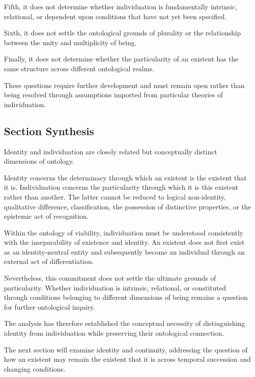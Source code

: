 Fifth, it does not determine whether individuation is fundamentally intrinsic, relational, or dependent upon conditions that have not yet been specified.

Sixth, it does not settle the ontological grounds of plurality or the relationship between the unity and multiplicity of being.

Finally, it does not determine whether the particularity of an existent has the same structure across different ontological realms.

These questions require further development and must remain open rather than being resolved through assumptions imported from particular theories of individuation.

\subsection{Section Synthesis}

Identity and individuation are closely related but conceptually distinct dimensions of ontology.

Identity concerns the determinacy through which an existent is the existent that it is. Individuation concerns the particularity through which it is this existent rather than another. The latter cannot be reduced to logical non-identity, qualitative difference, classification, the possession of distinctive properties, or the epistemic act of recognition.

Within the ontology of viability, individuation must be understood consistently with the inseparability of existence and identity. An existent does not first exist as an identity-neutral entity and subsequently become an individual through an external act of differentiation.

Nevertheless, this commitment does not settle the ultimate grounds of particularity. Whether individuation is intrinsic, relational, or constituted through conditions belonging to different dimensions of being remains a question for further ontological inquiry.

The analysis has therefore established the conceptual necessity of distinguishing identity from individuation while preserving their ontological connection.

The next section will examine identity and continuity, addressing the question of how an existent may remain the existent that it is across temporal succession and changing conditions.
